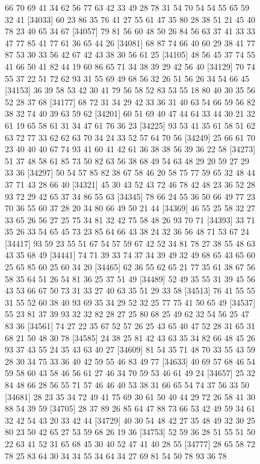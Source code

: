 \documentclass{article}
\begin{document}
\begin{figure}[H]
\begin{Schunk}
\begin{Soutput}
[34009] 66 70 69 41 34 62 56 77 63 42 33 49 28 78 31 54 70 54 54 55 65 59 32 41
[34033] 60 23 86 35 76 41 27 55 61 47 35 80 28 38 51 21 45 40 78 23 40 65 34 67
[34057] 79 81 56 60 48 50 26 84 56 63 37 41 33 33 47 77 85 41 77 61 36 65 44 26
[34081] 68 87 74 66 40 60 29 38 41 77 87 53 30 33 56 42 67 42 43 38 30 56 61 25
[34105] 48 56 45 37 74 55 41 66 50 41 82 44 19 60 86 65 71 34 38 39 29 42 56 40
[34129] 70 74 55 37 22 51 72 62 93 31 55 69 49 68 56 32 26 51 56 26 34 54 66 45
[34153] 36 39 58 53 42 30 41 79 56 58 52 83 53 55 18 80 40 30 35 56 52 28 37 68
[34177] 68 72 31 34 29 42 33 36 31 40 63 54 66 59 56 82 38 32 74 40 39 63 59 62
[34201] 60 51 69 40 47 44 64 33 44 30 21 32 61 19 65 58 61 31 34 47 61 76 36 23
[34225] 93 53 41 35 61 58 51 62 63 72 77 33 62 62 63 70 34 24 33 52 57 64 70 56
[34249] 25 66 61 70 23 40 40 40 67 74 93 41 60 41 42 61 36 38 38 56 39 36 22 58
[34273] 51 37 48 58 61 85 73 50 82 63 56 38 68 49 54 63 48 29 20 59 27 29 33 36
[34297] 50 54 57 85 82 38 67 58 46 20 58 75 77 59 65 32 48 44 37 71 43 28 66 40
[34321] 45 30 43 52 43 72 46 78 42 48 23 36 52 28 93 72 29 42 65 37 34 86 55 63
[34345] 78 66 24 55 36 50 66 49 77 23 70 36 55 60 37 28 20 34 80 66 49 50 21 44
[34369] 46 55 25 58 32 27 33 65 26 56 27 25 75 34 81 32 42 75 58 48 26 93 70 71
[34393] 33 71 35 26 33 54 65 45 73 23 85 64 66 43 38 24 32 36 56 48 71 53 67 24
[34417] 93 59 23 55 51 67 54 57 59 67 42 52 34 81 78 27 38 55 48 63 43 35 68 49
[34441] 74 71 39 33 74 37 34 39 49 32 49 68 65 43 65 60 25 65 85 60 25 60 34 20
[34465] 62 36 55 62 65 21 77 35 61 38 67 56 58 35 64 51 26 54 81 36 25 37 51 49
[34489] 52 49 35 55 31 39 45 56 43 53 66 67 50 73 31 33 27 40 63 35 51 29 33 58
[34513] 76 41 55 55 31 55 52 60 38 40 93 69 35 34 29 52 32 25 77 75 41 50 65 49
[34537] 55 23 81 37 39 93 32 32 82 28 27 25 80 68 25 49 62 32 54 56 25 47 83 36
[34561] 74 27 22 35 67 52 57 26 25 43 65 40 47 52 28 31 65 31 68 21 50 48 30 78
[34585] 24 38 25 81 42 43 63 35 34 82 66 48 45 26 93 37 43 55 24 35 43 63 40 27
[34609] 81 54 35 71 48 70 33 55 43 59 28 30 34 75 33 36 40 42 59 55 46 83 49 77
[34633] 40 69 57 68 46 54 59 58 60 43 58 46 56 61 27 46 34 70 59 53 46 61 49 24
[34657] 25 32 84 48 66 28 56 55 71 57 46 46 40 53 38 31 66 65 54 74 37 56 33 50
[34681] 28 23 35 34 72 49 41 75 69 30 61 50 40 44 29 72 26 58 41 30 88 54 39 59
[34705] 28 37 89 26 85 64 47 88 73 66 53 42 49 59 34 61 32 42 54 43 20 33 42 44
[34729] 40 30 54 48 42 27 35 48 49 32 30 25 80 23 50 42 65 27 53 59 68 26 19 36
[34753] 52 59 36 28 51 55 51 50 22 63 41 52 31 65 68 45 30 40 52 47 41 40 28 55
[34777] 28 65 58 72 78 25 83 64 30 34 34 55 34 64 34 27 69 81 54 50 78 93 36 78

\end{Soutput}
\end{Schunk}
\end{figure}
\end{document}
